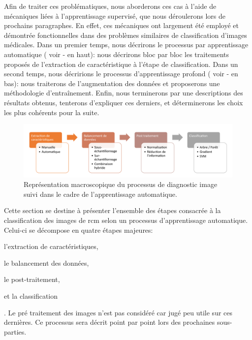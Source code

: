 Afin de traiter ces problématiques, nous aborderons ces cas à l'aide de mécaniques liées à l'apprentissage supervisé, que nous déroulerons lors de prochains paragraphes. En effet, ces mécaniques ont largement été employé et démontrée fonctionnelles dans des problèmes similaires de classification d'images médicales. Dans un premier temps, nous décrirons le processus par apprentissage automatique ( voir  - en haut): nous décrirons bloc par bloc les traitements proposés de l'extraction de caractéristique à l'étape de classification. Dans un second temps, nous décririons le processus d'apprentissage profond ( voir  - en bas): nous traiterons de l'augmentation des données et proposerons une méthodologie d'entraînement. Enfin, nous terminerons par une descriptions des résultats obtenus, tenterons d'expliquer ces derniers, et déterminerons les choix les plus cohérents pour la suite.\par

\begin{figure}[H]
\centering
    \includegraphics[width=\linewidth]{contents/chapter_4/resources/scheme_macro_pipeline_machine.pdf}
    \caption{Représentation macroscopique du processus de diagnostic image suivi dans le cadre de l'apprentissage automatique.}
    \label{fig:scheme_macro_pipeline}
\end{figure}\par

Cette section se destine à présenter l'ensemble des étapes consacrée à la classification des images de \gls{rcm} selon un processus d'apprentissage automatique. Celui-ci se décompose en quatre étapes majeures:
\begin{inlinerate}
    \item l'extraction de caractéristiques,
    \item le balancement des données,
    \item le post-traitement,
    \item et la classification
\end{inlinerate}.
Le pré traitement des images n'est pas considéré car jugé peu utile sur ces dernières. Ce processus sera décrit point par point lors des prochaines sous-parties.\par
\newpage

